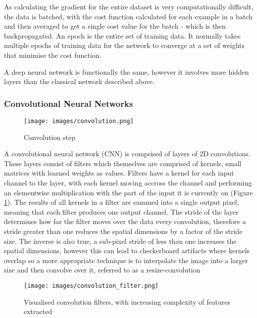 \documentclass[twocolumn]{article}
\begin{document}
As calculating the gradient for the entire dataset is very computationally difficult, the data is batched, with the cost function calculated for each example in a batch and then averaged to get a single cost value for the batch - which is then backpropagated.
An epoch is the entire set of training data. It normally takes multiple epochs of training data for the network to converge at a set of weights that minimise the cost function.

A deep neural network is functionally the same, however it involves more hidden layers than the classical network described above.

\subsubsection{Convolutional Neural Networks}
\label{sec:org404a125}

\begin{figure}[htbp]
\centering
\texttt{[image: images/convolution.png]}
\caption{\label{fig:convolution}Convolution step\autocite{ConvolutionalNeuralNetworks}}
\end{figure}

A convolutional neural network (CNN) is comprised of layers of 2D convolutions.
These layers consist of filters which themselves are comprised of kernels, small matrices with learned weights as values\autocite{osheaIntroductionConvolutionalNeural2015}.
Filters have a kernel for each input channel to the layer, with each kernel moving accross the channel and performing an elementwise multiplication with the part of the input it is currently on (Figure \ref{fig:convolution}).
The results of all kernels in a filter are summed into a single output pixel, meaning that each filter produces one output channel.
The stride of the layer determines how far the filter moves over the data every convolution, therefore a stride greater than one reduces the spatial dimensions by a factor of the stride size\autocite{dumoulinGuideConvolutionArithmetic2018}.
The inverse is also true, a sub-pixel stride of less than one increases the spatial dimensions, however this can lead to checkerboard artifacts where kernels overlap so a more appropriate technique is to interpolate the image into a larger size and then convolve over it, referred to as a resize-convolution\autocite{odenaDeconvolutionCheckerboardArtifacts2016}\autocite{aitkenCheckerboardArtifactFree2017}

\begin{figure}[htbp]
\centering
\texttt{[image: images/convolution\_filter.png]}
\caption{\label{fig:convolution_filter}Visualised convolution filters, with increasing complexity of features extracted\autocite{graetzHowVisualizeConvolutional2019}}
\end{figure}
\end{document}
